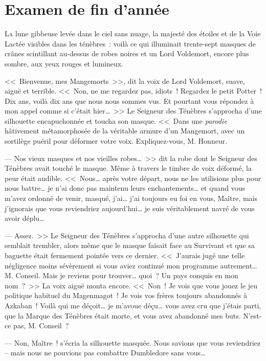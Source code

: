 \chapter{Examen de fin d’année}

\lettrine{L}{a} lune gibbeuse levée dans le ciel sans nuage, la majesté des étoiles et de la Voie Lactée visibles dans les ténèbres~: voilà ce qui illuminait trente-sept masques de crânes scintillant au-dessus de robes noires et un Lord Voldemort, encore plus sombre, aux yeux rouges et lumineux.

<<~Bienvenue, mes Mangemorts~>>, dit la voix de Lord Voldemort, suave, aiguë et terrible. <<~Non, ne me regardez pas, idiots~! Regardez le petit Potter~! Dix ans, voilà dix ans que nous nous sommes vus. Et pourtant vous répondez à mon appel comme si c'était hier…~>> Le Seigneur des Ténèbres s'approcha d'une silhouette encapuchonnée et toucha son masque. <<~Dans une \emph{parodie} hâtivement métamorphosée de la véritable armure d'un Mangemort, avec un sortilège puéril pour déformer votre voix. Expliquez-vous, M. Honneur.

--- Nos vieux masques et nos vieilles robes…~>> dit la robe dont le Seigneur des Ténèbres avait touché le masque. Même à travers le timbre de voix déformé, la peur était audible. <<~Nous… après votre départ, nous ne les utilisions plus pour nous battre… je n'ai donc pas maintenu leurs enchantements… et quand vous m'avez ordonné de venir, masqué, j'ai… j'ai toujours eu foi en vous, Maître, mais j'ignorais que vous reviendriez aujourd'hui… je suis véritablement navré de vous avoir déplu…

--- Assez.~>> Le Seigneur des Ténèbres s'approcha d'une autre silhouette qui semblait trembler, alors même que le masque faisait face au Survivant et que sa baguette était fermement pointée vers ce dernier. <<~J'aurais jugé une telle négligence moins sévèrement si vous aviez continué mon programme autrement… M. Conseil. Mais je reviens pour trouver… quoi~? Un pays conquis en mon nom~?~>> La voix aiguë monta encore. <<~Non~! Je vois que vous jouez le jeu politique habituel du Magenmagot~! Je vois vos frères toujours abandonnés à Azkaban~! Voilà qui me déçoit… je m'avoue déçu… vous avez cru que j'étais parti, que la Marque des Ténèbres était morte, et vous avez abandonné mes buts. N'est-ce pas, M. Conseil~?

--- Non, Maître~! s'écria la silhouette masquée. Nous savions que vous reviendriez -- mais nous ne pouvions pas combattre Dumbledore sans vous…


